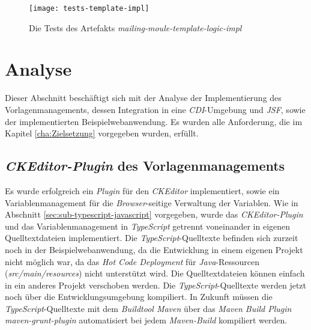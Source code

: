 \begin{figure}[h]
\centering
\texttt{[image: tests-template-impl]}
\caption{Die Tests des Artefakts \emph{mailing-moule-template-logic-impl}}
\label{fig:tests-template-impl}
\end{figure}

\section{Analyse}
Dieser Abschnitt beschäftigt sich mit der Analyse der Implementierung des Vorlagenmanagements, dessen Integration in eine \emph{CDI}-Umgebung und \emph{JSF}, sowie der implementierten Beispielwebanwendung. Es wurden alle Anforderung, die im Kapitel \ref{cha:Zielsetzung} vorgegeben wurden, erfüllt.

\subsection{\emph{CKEditor-Plugin} des Vorlagenmanagements}
Es wurde erfolgreich ein \emph{Plugin} für den \emph{CKEditor} implementiert, sowie ein Variablenmanagement für die \emph{Browser}-seitige Verwaltung der Variablen. Wie in Abschnitt \ref{sec:sub-typescript-javascript} vorgegeben, wurde das \emph{CKEditor-Plugin} und das Variablenmanagement in \emph{TypeScript} getrennt voneinander in eigenen Quelltextdateien implementiert. Die \emph{TypeScript}-Quelltexte befinden sich zurzeit noch in der Beispielwebanwendung, da die Entwicklung in einem eigenen Projekt nicht möglich war, da das \emph{Hot Code Deployment} für \emph{Java}-Ressourcen (\emph{src/main/resources}) nicht unterstützt wird. Die Quelltextdateien können einfach in ein anderes Projekt verschoben werden. Die \emph{TypeScript}-Quelltexte werden jetzt noch über die Entwicklungsumgebung kompiliert. In Zukunft müssen die \emph{TypeScript}-Quelltexte mit dem \emph{Buildtool Maven} über das \emph{Maven Build Plugin maven-grunt-plugin} automatisiert bei jedem \emph{Maven-Build} kompiliert werden.

